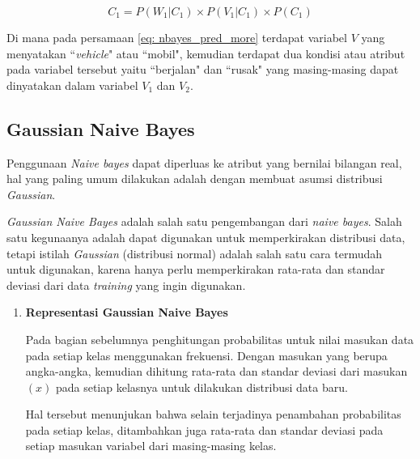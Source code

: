 \begin{subs}
\begin{enumerate}[label=\textbf{\arabic*).}]
		\begin{equation}
			\label{eq: nbayes_pred_more}
			C_{1} = P(W_{1}|C_{1}) \times P(V_{1}|C_{1}) \times P(C_{1})
		\end{equation}
	
		Di mana pada persamaan \ref{eq: nbayes_pred_more} terdapat variabel $V$ yang menyatakan ``\textit{vehicle}" atau ``mobil", kemudian terdapat dua kondisi atau atribut pada variabel tersebut yaitu ``berjalan" dan ``rusak" yang masing-masing dapat dinyatakan dalam variabel $V_{1}$ dan $V_{2}$.
		\vspace{1ex}
	\end{enumerate}
	
	\subsection{Gaussian Naive Bayes}
	\label{sec:sub_sec2_gauss_bayes}
	\vspace{1ex}
	
	Penggunaan \textit{Naive bayes} dapat diperluas ke atribut yang bernilai bilangan real, hal yang paling umum dilakukan adalah dengan membuat asumsi distribusi \textit{Gaussian}.
	\vspace{1ex}
	
	\textit{Gaussian Naive Bayes} adalah salah satu pengembangan dari \textit{naive bayes}. Salah satu kegunaanya adalah dapat digunakan untuk memperkirakan distribusi data, tetapi istilah \textit{Gaussian} (distribusi normal) adalah salah satu cara termudah untuk digunakan, karena hanya perlu memperkirakan rata-rata dan standar deviasi dari data \textit{training} yang ingin digunakan.
	\vspace{1ex}
	
	\begin{enumerate}[label=\textbf{\arabic*).}]
		
		\item \textbf{Representasi Gaussian Naive Bayes}
		\setlength{\parindent}{0.8cm}
	
		Pada bagian sebelumnya penghitungan probabilitas untuk nilai masukan data pada setiap kelas menggunakan frekuensi. Dengan masukan yang berupa angka-angka, kemudian dihitung rata-rata dan standar deviasi dari masukan $(x)$ pada setiap kelasnya untuk dilakukan distribusi data baru.
		\vspace{1ex}
		
		Hal tersebut menunjukan bahwa selain terjadinya penambahan probabilitas pada setiap kelas, ditambahkan juga rata-rata dan standar deviasi pada setiap masukan variabel dari masing-masing kelas.
	

\end{enumerate}
\end{subs}
